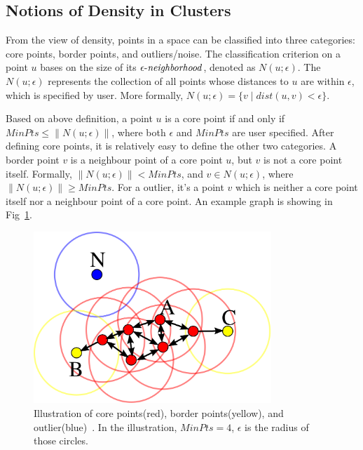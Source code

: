 \subsection{Notions of Density in Clusters}
\label{subsec:DBSCANnotion}
From the view of density, points in a space can be classified into three categories: core points, border points, and outliers/noise. The classification criterion on a point $u$ bases on the size of its $\id{\epsilon-neighborhood}$, denoted as $N(u;\epsilon)$. The $N(u;\epsilon)$ represents the collection of all points whose distances to $u$ are within $\epsilon$, which is specified by user. More formally, $N(u;\epsilon) = \{v\mid dist(u, v) < \epsilon\}$. 

Based on above definition, a point $u$ is a core point if and only if $MinPts \leq \|N(u;\epsilon)\|$, where both $\epsilon$ and $MinPts$ are user specified. After defining core points, it is relatively easy to define the other two categories. A border point $v$ is a neighbour point of a core point $u$, but $v$ is not a core point itself. Formally, $\|N(u;\epsilon)\| < MinPts$, and $v \in N(u;\epsilon)$, where $\|N(u;\epsilon)\| \geq MinPts$. For a outlier, it's a point $v$ which is neither a core point itself nor a neighbour point of a core point. An example graph is showing in Fig~\ref{fig:DBSCANConcept}.

\begin{figure}[ht]
	\begin{center}
		\includegraphics[width=0.8\textwidth]{images/DBSCAN-Illustration.png}
		\caption{Illustration of core points(red), border points(yellow), and outlier(blue)~\cite{wiki:DBSCAN}. In the illustration, $MinPts = 4$, $\epsilon$ is the radius of those circles.}
		\label{fig:DBSCANConcept}
	\end{center}
\end{figure}

